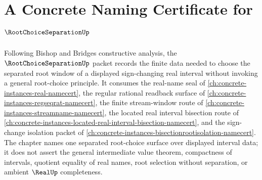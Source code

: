 \chapter{A Concrete Naming Certificate for $\RootChoiceSeparationUp$}
\label{ch:concrete-instances-root-choice-separation-namecert}

Following Bishop and Bridges constructive analysis, the $\RootChoiceSeparationUp$ packet records the finite data needed to choose the separated root window of a displayed sign-changing real interval without invoking a general root-choice principle. It consumes the real-name seal of \autoref{ch:concrete-instances-real-namecert}, the regular rational readback surface of \autoref{ch:concrete-instances-regseqrat-namecert}, the finite stream-window route of \autoref{ch:concrete-instances-streamname-namecert}, the located real interval bisection route of \autoref{ch:concrete-instances-located-real-interval-bisection-namecert}, and the sign-change isolation packet of \autoref{ch:concrete-instances-bisectionrootisolation-namecert}. The chapter names one separated root-choice surface over displayed interval data; it does not assert the general intermediate value theorem, compactness of intervals, quotient equality of real names, root selection without separation, or ambient $\RealUp$ completeness.

